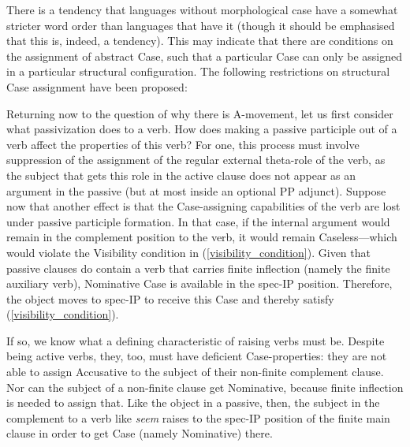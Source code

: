 \documentclass{article}
\begin{document}
There is a tendency that languages without morphological case have a somewhat stricter word order than languages that have it (though it should be emphasised that this is, indeed, a tendency).
This may indicate that there are conditions on the assignment of abstract Case, such that a particular Case can only be assigned in a particular structural configuration.
The following restrictions on structural Case assignment have been proposed:
\begin{exe}
\end{exe}
Returning now to the question of why there is A-movement, let us first consider what passivization does to a verb.
How does making a passive participle out of a verb affect the properties of this verb?
For one, this process must involve suppression of the assignment of the regular external theta-role of the verb, as the subject that gets this role in the active clause does not appear as an argument in the passive (but at most inside an optional PP adjunct).
Suppose now that another effect is that the Case-assigning capabilities of the verb are lost under passive participle formation.
In that case, if the internal argument would remain in the complement position to the verb, it would remain Caseless---which would violate the Visibility condition in (\ref{visibility_condition}).
Given that passive clauses do contain a verb that carries finite inflection (namely the finite auxiliary verb), Nominative Case is available in the spec-IP position.
Therefore, the object moves to spec-IP to receive this Case and thereby satisfy (\ref{visibility_condition}).

If so, we know what a defining characteristic of raising verbs must be.
Despite being active verbs, they, too, must have deficient Case-properties: they are not able to assign Accusative to the subject of their non-finite complement clause.
Nor can the subject of a non-finite clause get Nominative, because finite inflection is needed to assign that.
Like the object in a passive, then, the subject in the complement to a verb like \emph{seem} raises to the spec-IP position of the finite main clause in order to get Case (namely Nominative) there.
\end{document}
